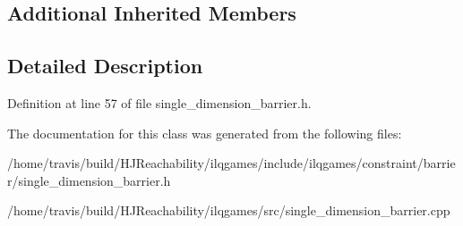 \subsection*{Additional Inherited Members}


\subsection{Detailed Description}


Definition at line 57 of file single\+\_\+dimension\+\_\+barrier.\+h.



The documentation for this class was generated from the following files\+:\begin{DoxyCompactItemize}
\item 
/home/travis/build/\+H\+J\+Reachability/ilqgames/include/ilqgames/constraint/barrier/single\+\_\+dimension\+\_\+barrier.\+h\item 
/home/travis/build/\+H\+J\+Reachability/ilqgames/src/single\+\_\+dimension\+\_\+barrier.\+cpp\end{DoxyCompactItemize}
